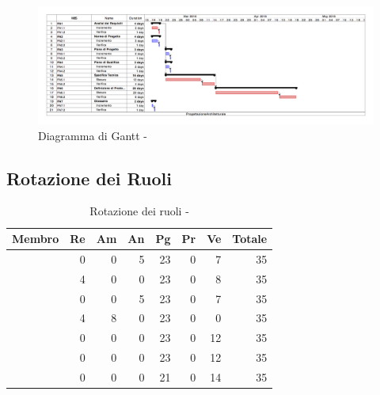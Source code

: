\documentclass[12pt,a4paper]{article}
\begin{document}
\begin{center}
	\begin{figure}[H]
		\centering
		\includegraphics[width=\textwidth]{GanttProgettazioneArchitetturale.png}
		\caption{Diagramma di Gantt - \FPA}
	\end{figure}
\end{center}

\subsection{Rotazione dei Ruoli}

\begin{table}[H]
	\begin{center}
		\begin{tabular}{l r r r r r r r}
			\toprule
			\textbf{Membro}	&	\textbf{Re}	&	\textbf{Am}	& \textbf{An} & \textbf{Pg} & \textbf{Pr} & \textbf{Ve} & \textbf{Totale}\\
			\midrule
			\midrule
			\IB & 0 & 0 & 5 & 23 & 0 & 7 & 35 \\
			\midrule
			\AB & 4 & 0 & 0 & 23 & 0 & 8 & 35 \\
			\midrule
			\NDC & 0 & 0 & 5 & 23 & 0 & 7 & 35 \\
			\midrule
			\TP & 4 & 8 & 0 & 23 & 0 & 0 & 35 \\
			\midrule
			\WS & 0 & 0 & 0 & 23 & 0 & 12 & 35 \\
			\midrule
			\AVE & 0 & 0 & 0 & 23 & 0 & 12 & 35 \\
			\midrule
			\AVI & 0 & 0 & 0 & 21 & 0 & 14 & 35 \\
			\bottomrule
		\end{tabular}
		\caption{Rotazione dei ruoli - \FPA}
	\end{center}
\end{table}
\end{document}

